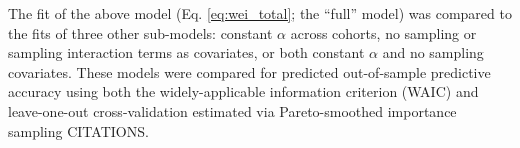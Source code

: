 \documentclass[12pt,letterpaper]{article}
\begin{document}
The fit of the above model (Eq. \ref{eq:wei_total}; the ``full'' model) was compared to the fits of three other sub-models: constant \(\alpha\) across cohorts, no sampling or sampling interaction terms as covariates, or both constant \(\alpha\) and no sampling covariates. These models were compared for predicted out-of-sample predictive accuracy using both the widely-applicable information criterion (WAIC) and leave-one-out cross-validation estimated via Pareto-smoothed importance sampling CITATIONS.

%

\end{document}
